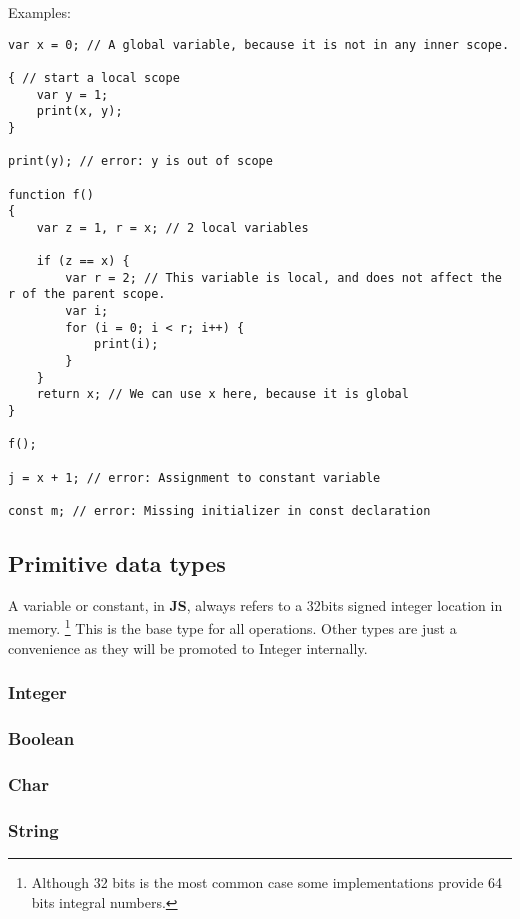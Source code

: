 Examples:

\begin{lstlisting}[language=uJS]
var x = 0; // A global variable, because it is not in any inner scope.

{ // start a local scope
	var y = 1;
	print(x, y); 
}

print(y); // error: y is out of scope 

function f() 
{
	var z = 1, r = x; // 2 local variables

	if (z == x) {
		var r = 2; // This variable is local, and does not affect the r of the parent scope.
		var i;
		for (i = 0; i < r; i++) { 
			print(i); 
		}
	}
	return x; // We can use x here, because it is global
}

f();

j = x + 1; // error: Assignment to constant variable

const m; // error: Missing initializer in const declaration

\end{lstlisting}

\subsection{Primitive data types}

A variable or constant, in \textbf{\textmu JS}, always refers to a 32bits signed integer location in memory. \footnote{Although 32 bits is the most common case some implementations provide 64 bits integral numbers.} This is the base type for all operations. Other types are just a convenience as they will be promoted to Integer internally.

\subsubsection {Integer}

\subsubsection {Boolean}

\subsubsection {Char}

\subsubsection {String}

